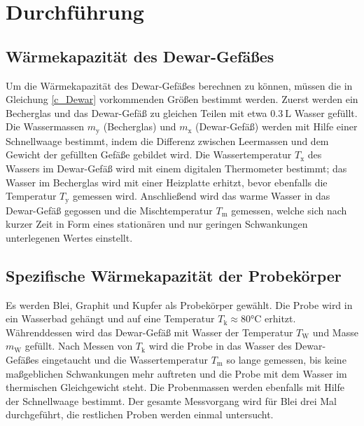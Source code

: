 \section{Durchführung}
\label{sec:Durchfuehrung}
\subsection{Wärmekapazität des Dewar-Gefäßes}
Um die Wärmekapazität des Dewar-Gefäßes berechnen zu können, müssen die in Gleichung \eqref{c_Dewar} vorkommenden Größen bestimmt werden.
Zuerst werden ein Becherglas und das Dewar-Gefäß zu gleichen Teilen mit etwa $\SI{0.3}{\liter}$ Wasser gefüllt. 
Die Wassermassen $m_\mathup{y}$ (Becherglas) und $m_\mathup{x}$ (Dewar-Gefäß) werden mit Hilfe einer Schnellwaage bestimmt, indem die Differenz zwischen Leermassen und dem Gewicht der gefüllten Gefäße gebildet wird.
Die Wassertemperatur $T_\mathup{x}$ des Wassers im Dewar-Gefäß wird mit einem digitalen Thermometer bestimmt; das Wasser im Becherglas wird mit einer Heizplatte erhitzt, bevor ebenfalls die Temperatur $T_\mathup{y}$ gemessen wird. 
Anschließend wird das warme Wasser in das Dewar-Gefäß gegossen und die Mischtemperatur $T_\mathup{m}$ gemessen, welche sich nach kurzer Zeit in Form eines stationären und nur geringen Schwankungen unterlegenen Wertes einstellt.

\subsection{Spezifische Wärmekapazität der Probekörper}
Es werden Blei, Graphit und Kupfer als Probekörper gewählt.
Die Probe wird in ein Wasserbad gehängt und auf eine Temperatur $T_\mathup{k}\approx80\si\celsius$ erhitzt. 
Währenddessen wird das Dewar-Gefäß mit Wasser der Temperatur $T_\mathup{W}$ und Masse $m_\mathup{W}$ gefüllt. 
Nach Messen von $T_\mathup{k}$ wird die Probe in das Wasser des Dewar-Gefäßes eingetaucht und die Wassertemperatur $T_\mathup{m}$ so lange gemessen, bis keine maßgeblichen Schwankungen mehr auftreten und die Probe mit dem Wasser im thermischen Gleichgewicht steht.
Die Probenmassen werden ebenfalls mit Hilfe der Schnellwaage bestimmt.
Der gesamte Messvorgang wird für Blei drei Mal durchgeführt, die restlichen Proben werden einmal untersucht.
